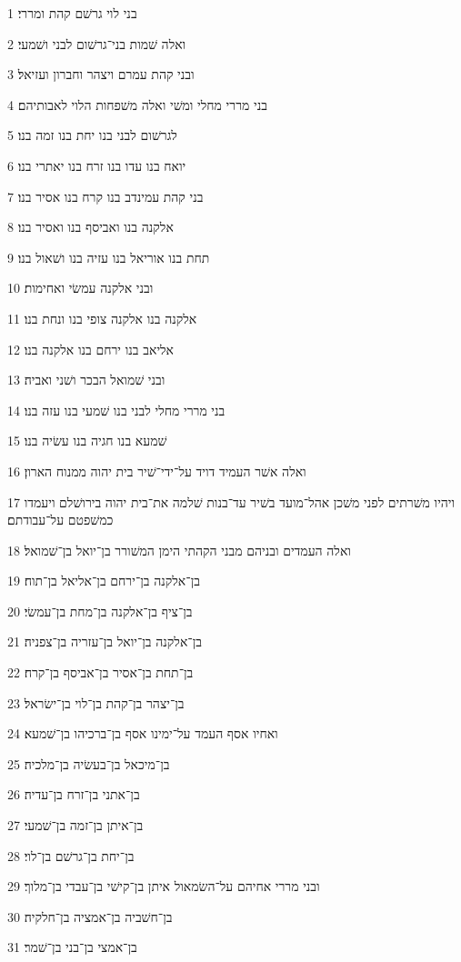\par 1 בני לוי גרשׁם קהת ומררי׃
\par 2 ואלה שׁמות בני־גרשׁום לבני ושׁמעי׃
\par 3 ובני קהת עמרם ויצהר וחברון ועזיאל׃
\par 4 בני מררי מחלי ומשׁי ואלה משׁפחות הלוי לאבותיהם׃
\par 5 לגרשׁום לבני בנו יחת בנו זמה בנו׃
\par 6 יואח בנו עדו בנו זרח בנו יאתרי בנו׃
\par 7 בני קהת עמינדב בנו קרח בנו אסיר בנו׃
\par 8 אלקנה בנו ואביסף בנו ואסיר בנו׃
\par 9 תחת בנו אוריאל בנו עזיה בנו ושׁאול בנו׃
\par 10 ובני אלקנה עמשׂי ואחימות׃
\par 11 אלקנה בנו אלקנה צופי בנו ונחת בנו׃
\par 12 אליאב בנו ירחם בנו אלקנה בנו׃
\par 13 ובני שׁמואל הבכר ושׁני ואביה׃
\par 14 בני מררי מחלי לבני בנו שׁמעי בנו עזה בנו׃
\par 15 שׁמעא בנו חגיה בנו עשׂיה בנו׃
\par 16 ואלה אשׁר העמיד דויד על־ידי־שׁיר בית יהוה ממנוח הארון׃
\par 17 ויהיו משׁרתים לפני משׁכן אהל־מועד בשׁיר עד־בנות שׁלמה את־בית יהוה בירושׁלם ויעמדו כמשׁפטם על־עבודתם׃
\par 18 ואלה העמדים ובניהם מבני הקהתי הימן המשׁורר בן־יואל בן־שׁמואל׃
\par 19 בן־אלקנה בן־ירחם בן־אליאל בן־תוח׃
\par 20 בן־ציף בן־אלקנה בן־מחת בן־עמשׂי׃
\par 21 בן־אלקנה בן־יואל בן־עזריה בן־צפניה׃
\par 22 בן־תחת בן־אסיר בן־אביסף בן־קרח׃
\par 23 בן־יצהר בן־קהת בן־לוי בן־ישׂראל׃
\par 24 ואחיו אסף העמד על־ימינו אסף בן־ברכיהו בן־שׁמעא׃
\par 25 בן־מיכאל בן־בעשׂיה בן־מלכיה׃
\par 26 בן־אתני בן־זרח בן־עדיה׃
\par 27 בן־איתן בן־זמה בן־שׁמעי׃
\par 28 בן־יחת בן־גרשׁם בן־לוי׃
\par 29 ובני מררי אחיהם על־השׂמאול איתן בן־קישׁי בן־עבדי בן־מלוך׃
\par 30 בן־חשׁביה בן־אמציה בן־חלקיה׃
\par 31 בן־אמצי בן־בני בן־שׁמר׃
